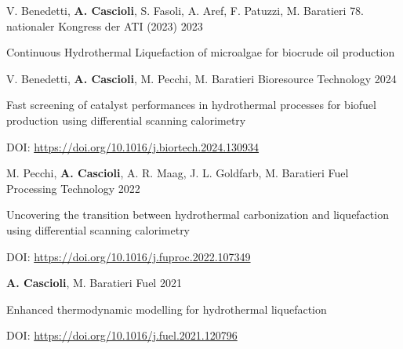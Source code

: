 
\begin{cventries}

\cventry
{V. Benedetti, \textbf{A. Cascioli}, S. Fasoli, A. Aref, F. Patuzzi, M. Baratieri}
{78. nationaler Kongress der ATI (2023)}
{}
{2023}
{\begin{cvitems}
\item {Continuous Hydrothermal Liquefaction of microalgae for biocrude oil production}
\end{cvitems}}

\cventry
{V. Benedetti, \textbf{A. Cascioli}, M. Pecchi, M. Baratieri}
{Bioresource Technology}
{}
{2024}
{\begin{cvitems}
\item {Fast screening of catalyst performances in hydrothermal processes for biofuel production using differential scanning calorimetry}
\item {DOI: \href{https://doi.org/10.1016/j.biortech.2024.130934}{https://doi.org/10.1016/j.biortech.2024.130934}}
\end{cvitems}}

\cventry
{M. Pecchi, \textbf{A. Cascioli}, A. R. Maag, J. L. Goldfarb, M. Baratieri}
{Fuel Processing Technology}
{}
{2022}
{\begin{cvitems}
\item {Uncovering the transition between hydrothermal carbonization and liquefaction using differential scanning calorimetry}
\item {DOI: \href{https://doi.org/10.1016/j.fuproc.2022.107349}{https://doi.org/10.1016/j.fuproc.2022.107349}}
\end{cvitems}}

\cventry
{\textbf{A. Cascioli}, M. Baratieri}
{Fuel}
{}
{2021}
{\begin{cvitems}
\item {Enhanced thermodynamic modelling for hydrothermal liquefaction}
\item {DOI: \href{https://doi.org/10.1016/j.fuel.2021.120796}{https://doi.org/10.1016/j.fuel.2021.120796}}
\end{cvitems}}

\end{cventries}